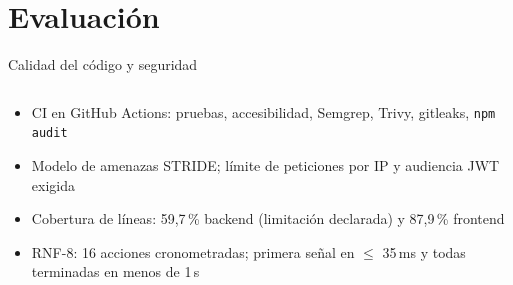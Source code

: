 \documentclass[aspectratio=169,11pt]{beamer}
\begin{document}
\section{Evaluación}
\begin{frame}{Calidad del código y seguridad}
  \begin{columns}[T]
  \end{columns}
  \vspace{10pt}
  \begin{itemize}\small
    \item CI en GitHub Actions: pruebas, accesibilidad, Semgrep, Trivy, gitleaks, \texttt{npm audit}
    \item Modelo de amenazas STRIDE; límite de peticiones por IP y audiencia JWT exigida
    \item Cobertura de líneas: 59,7\,\% backend (limitación declarada) y 87,9\,\% frontend
    \item RNF-8: 16 acciones cronometradas; primera señal en \(\le\) 35\,ms y todas terminadas en menos de 1\,s
  \end{itemize}
\end{frame}
\end{document}
